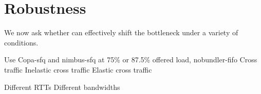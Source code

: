 \section{Robustness}\label{s:robust}

We now ask whether \name can effectively shift the bottleneck under a variety of conditions.

\begin{outline}
\1 Use Copa-sfq and nimbus-sfq at 75\% or 87.5\% offered load, nobundler-fifo
\1 Cross traffic
\2 Inelastic cross traffic
\2 Elastic cross traffic

\1 Different RTTs
\1 Different bandwidths
\end{outline}
